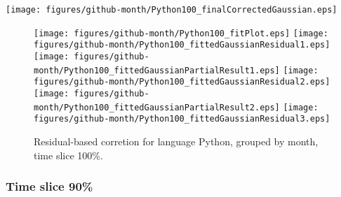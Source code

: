 \begin{center}
{\texttt{[image: figures/github-month/Python100\_finalCorrectedGaussian.eps]}}
\end{center}

\FloatBarrier

\begin{figure}[t]
\centering
{}
{\texttt{[image: figures/github-month/Python100\_fitPlot.eps]}}
{\texttt{[image: figures/github-month/Python100\_fittedGaussianResidual1.eps]}}
{\texttt{[image: figures/github-month/Python100\_fittedGaussianPartialResult1.eps]}}
{\texttt{[image: figures/github-month/Python100\_fittedGaussianResidual2.eps]}}
{\texttt{[image: figures/github-month/Python100\_fittedGaussianPartialResult2.eps]}}
{\texttt{[image: figures/github-month/Python100\_fittedGaussianResidual3.eps]}}
\caption{Residual-based corretion for language Python, grouped by month, time slice 100\%.}
\end{figure}


\FloatBarrier


\subsubsection{Time slice 90\%}

